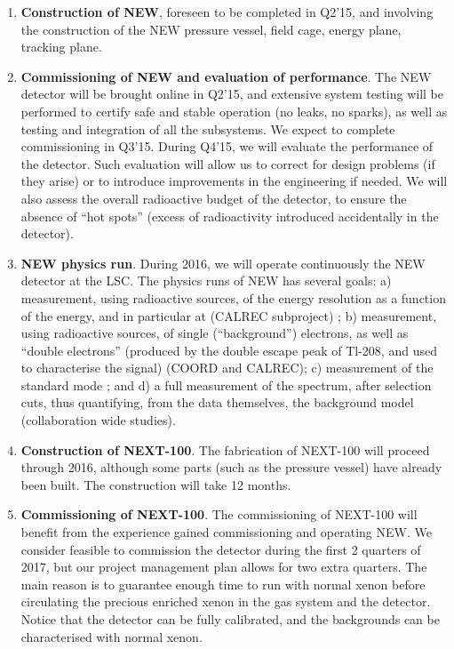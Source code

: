 \begin{enumerate}
\item {\bf Construction of NEW}, foreseen to be completed in Q2'15, and involving the construction of the NEW pressure vessel, field cage, energy plane, tracking plane.

\item {\bf Commissioning of NEW and evaluation of performance}. The NEW detector will be brought online in Q2'15, and extensive system testing will be performed to certify safe and stable operation (no leaks, no sparks), as well as testing and integration of all the subsystems. We expect to complete commissioning in Q3'15.
During Q4'15, we will evaluate the performance of the detector. Such evaluation will allow us to correct for design problems (if they arise) or to introduce improvements in the engineering if needed. We will also assess the overall radioactive budget of the detector, to ensure the absence of ``hot spots'' (excess of radioactivity introduced accidentally in the detector). 

\item {\bf NEW physics run}. During 2016, we will operate continuously the NEW detector at the LSC. The physics runs of NEW has several goals: a) measurement, using radioactive sources, of the energy resolution as a function of the energy, and in particular at \Qbb (CALREC subproject) ; b) measurement, using radioactive sources, of single (``background'') electrons, as well as ``double electrons'' (produced by the double escape peak of Tl-208, and used to characterise the signal) (COORD and CALREC); c) measurement of the standard mode \bbtnu; and d) a full measurement of the spectrum, after selection cuts, thus quantifying, from the data themselves, the background model (collaboration wide studies). 
%

\item {\bf Construction of NEXT-100}. The fabrication of NEXT-100 will proceed through 2016, although some parts (such as the pressure vessel) have already been built. The construction will take 12 months. 

\item {\bf Commissioning of NEXT-100}. The commissioning of NEXT-100 will benefit from the experience gained commissioning and operating NEW. We consider feasible to commission the detector during the first 2 quarters of 2017, but our project management plan allows for two extra quarters. The main reason is to guarantee enough time to run with normal xenon before circulating the precious enriched xenon in the gas system and the detector. Notice that the detector can be fully calibrated, and the backgrounds can be characterised with normal xenon.  


\end{enumerate}
